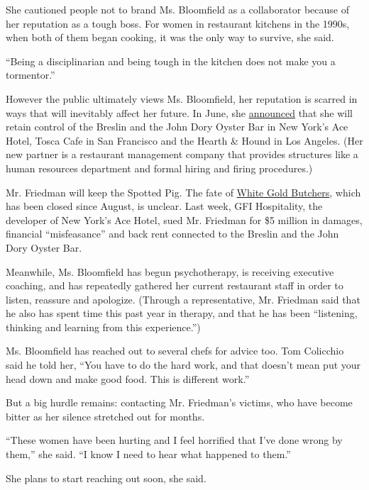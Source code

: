She cautioned people not to brand Ms. Bloomfield as a collaborator
because of her reputation as a tough boss. For women in restaurant
kitchens in the 1990s, when both of them began cooking, it was the only
way to survive, she said.

``Being a disciplinarian and being tough in the kitchen does not make
you a tormentor.''

However the public ultimately views Ms. Bloomfield, her reputation is
scarred in ways that will inevitably affect her future. In June, she
\href{https://www.nytimes3xbfgragh.onion/2018/06/06/dining/april-bloomfield-ken-friedman-split.html}{announced}
that she will retain control of the Breslin and the John Dory Oyster Bar
in New York's Ace Hotel, Tosca Cafe in San Francisco and the Hearth \&
Hound in Los Angeles. (Her new partner is a restaurant management
company that provides structures like a human resources department and
formal hiring and firing procedures.)

Mr. Friedman will keep the Spotted Pig. The fate of
\href{https://www.nytimes3xbfgragh.onion/2017/02/07/dining/white-gold-butchers-review-april-bloomfield-restaurant.html}{White
Gold Butchers}, which has been closed since August, is unclear. Last
week, GFI Hospitality, the developer of New York's Ace Hotel, sued Mr.
Friedman for \$5 million in damages, financial ``misfeasance'' and back
rent connected to the Breslin and the John Dory Oyster Bar.

Meanwhile, Ms. Bloomfield has begun psychotherapy, is receiving
executive coaching, and has repeatedly gathered her current restaurant
staff in order to listen, reassure and apologize. (Through a
representative, Mr. Friedman said that he also has spent time this past
year in therapy, and that he has been ``listening, thinking and learning
from this experience.'')

Ms. Bloomfield has reached out to several chefs for advice too. Tom
Colicchio said he told her, ``You have to do the hard work, and that
doesn't mean put your head down and make good food. This is different
work.''

But a big hurdle remains: contacting Mr. Friedman's victims, who have
become bitter as her silence stretched out for months.

``These women have been hurting and I feel horrified that I've done
wrong by them,'' she said. ``I know I need to hear what happened to
them.''

She plans to start reaching out soon, she said.

